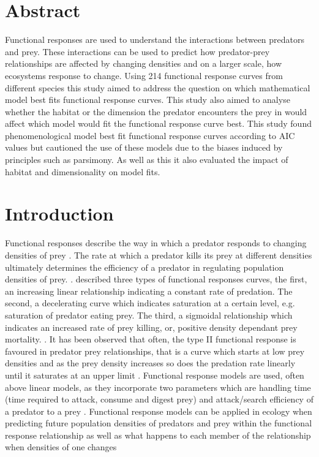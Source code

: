 \documentclass[11pt]{article}
\begin{document}
		\section*{Abstract}
	\noindent
	Functional responses are used to understand the interactions between predators and prey. These interactions can be used to predict how predator-prey relationships are affected by changing densities and on a larger scale, how ecosystems response to change. Using 214 functional response curves from different species this study aimed to address the question on which mathematical model best fits functional response curves. This study also aimed to analyse whether the habitat or the dimension the predator encounters the prey in would affect which model would fit the functional response curve best. This study found phenomenological model best fit functional response curves according to AIC values but cautioned the use of these models due to the biases induced by principles such as parsimony. As well as this it also evaluated the impact of habitat and dimensionality on model fits. 
	
	\section*{Introduction}
	\noindent

	
Functional responses describe the way in which a predator responds to changing densities of prey \cite{Holling1959}. The rate at which a predator kills its prey at different densities ultimately determines the efficiency of a predator in regulating population densities of prey. \cite{Murdoch1975}. \cite{Holling1959} described three types of functional responses curves, the first, an increasing linear relationship indicating a constant rate of predation. The second, a decelerating curve which indicates saturation at a certain level, e.g. saturation of predator eating prey. The third, a sigmoidal relationship which indicates an increased rate of prey killing, or, positive density dependant prey mortality. \cite{Pervez2005}. It has been observed that often, the type II functional response is favoured in predator prey relationships, that is a curve which starts at low prey densities and as the prey density increases so does the predation rate linearly until it saturates at an upper limit \cite{Jeschke2002}. Functional response models are used, often above linear models, as they incorporate two parameters which are handling time (time required to attack, consume and digest prey) and attack/search efficiency of a predator to a prey \cite{Fathipour2016}. Functional response models can be applied in ecology when predicting future population densities of predators and prey within the functional response relationship as well as what happens to each member of the relationship when densities of one changes \cite{Jeschke2002}
\end{document}
